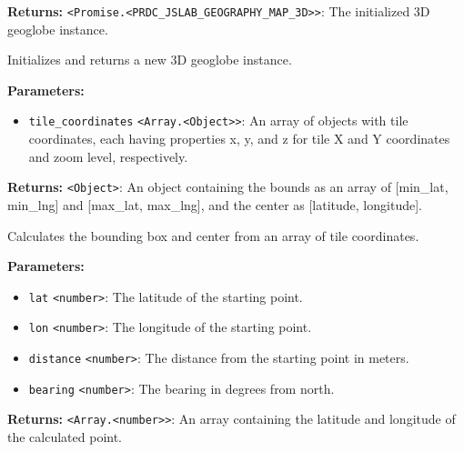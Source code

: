 \documentclass[12pt,a4paper]{article}
\begin{document}
\noindent \textbf{Returns:} \texttt{<Promise.<PRDC\_JSLAB\_GEOGRAPHY\_MAP\_3D>>}: The initialized 3D geoglobe instance.

\noindent Initializes and returns a new 3D geoglobe instance.

\vspace{5mm}
\noindent {}


\noindent \textbf{Parameters:}
\begin{itemize}
  \item \texttt{tile\_coordinates} \texttt{<Array.<Object>>}: An array of objects with tile coordinates, each having properties \textasciigrave{}x\textasciigrave{}, \textasciigrave{}y\textasciigrave{}, and \textasciigrave{}z\textasciigrave{} for tile X and Y coordinates and zoom level, respectively.
\end{itemize}

\noindent \textbf{Returns:} \texttt{<Object>}: An object containing the bounds as an array of \textasciigrave{}[min\_lat, min\_lng]\textasciigrave{} and \textasciigrave{}[max\_lat, max\_lng]\textasciigrave{}, and the center as \textasciigrave{}[latitude, longitude]\textasciigrave{}.

\noindent Calculates the bounding box and center from an array of tile coordinates.

\vspace{5mm}
\noindent {}


\noindent \textbf{Parameters:}
\begin{itemize}
  \item \texttt{lat} \texttt{<number>}: The latitude of the starting point.
  \item \texttt{lon} \texttt{<number>}: The longitude of the starting point.
  \item \texttt{distance} \texttt{<number>}: The distance from the starting point in meters.
  \item \texttt{bearing} \texttt{<number>}: The bearing in degrees from north.
\end{itemize}

\noindent \textbf{Returns:} \texttt{<Array.<number>>}: An array containing the latitude and longitude of the calculated point.
\end{document}
